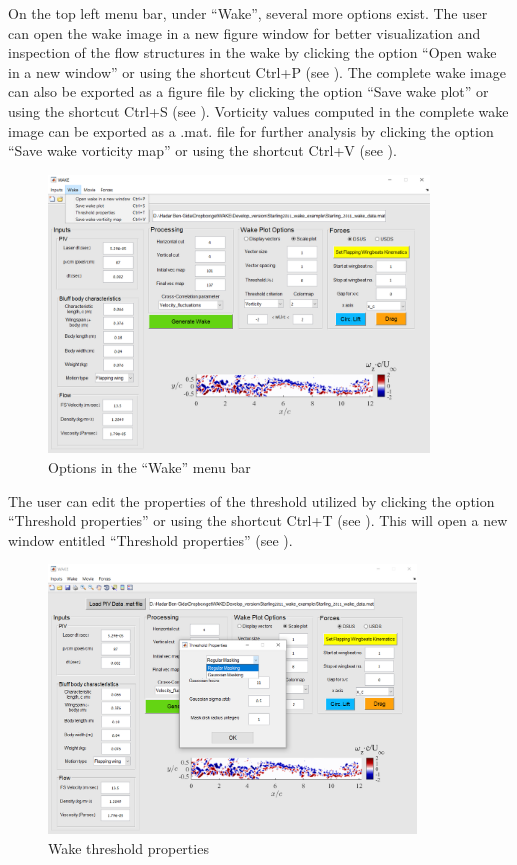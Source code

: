 \documentclass[12pt,a4paper]{article}
\begin{document}
On the top left menu bar, under ``Wake'', several more options exist.
The user can open the wake image in a new figure window for better visualization and inspection of the flow structures in the wake by clicking the option ``Open wake in a new window'' or using the shortcut Ctrl+P (see ).
The complete wake image can also be exported as a figure file by clicking the option ``Save wake plot'' or using the shortcut Ctrl+S (see ).
Vorticity values computed in the complete wake image can be exported as a .mat. file for further analysis by clicking the option ``Save wake vorticity map'' or using the shortcut Ctrl+V (see ).
  

 \begin{figure}[ht!]
 	\centering
 	\includegraphics[width=0.9\textwidth]{Wake-menuber-options}
 	\caption{Options in the ``Wake'' menu bar}
 	\label{fig:GUI-wake-menubar}
 \end{figure}

The user can edit the properties of the threshold utilized by clicking the option ``Threshold properties'' or using the shortcut Ctrl+T (see ). 
This will open a new window entitled ``Threshold properties'' (see ). 

\begin{figure}[ht!]
	\centering
	\includegraphics[width=0.87\textwidth]{Wake-threshold-properties}
	\caption{Wake threshold properties}
	\label{fig:GUI-Wake-threshold-properties}
\end{figure}
\end{document}
